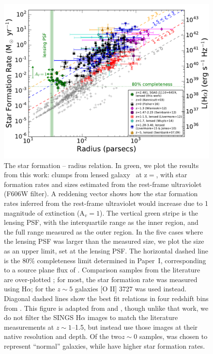 \begin{figure}
\includegraphics[width=\textwidth,angle=0]{Chap5/f2.pdf} %
\caption[The star formation -- radius relation for star forming clumps]{The star formation -- radius relation.  
In green, we plot the results from this work:
clumps from lensed galaxy  \giantarc\ at z$=$\zA,  
with star formation rates and sizes estimated 
from the rest-frame ultraviolet (F606W filter).  A reddening vector shows how the 
star formation rates inferred from the rest-frame ultraviolet would increase 
due to 1 magnitude of extinction (A$_v=1$).
The vertical green stripe is the lensing PSF, with the interquartile range 
as the inner region, and the full range measured as the outer region. 
In the five cases
where the lensing PSF was larger than the measured size,
we plot the size as an upper limit, set at the lensing PSF. 
The horizontal dashed line is the $80\%$ completeness limit determined
in Paper~I, corresponding to a source plane flux of \fluxcompleteness.
Comparison samples from the literature are over-plotted 
\citep{Swinbank:2007wj, Swinbank:2009lk, Jones:2010uq, Wisnioski:2012qf, 
Livermore:2012fk, Swinbank:2012jk, Wuyts:2014uq, Livermore:2015ve, Fisher:2017tk}; 
for most,   the star formation rate was measured using H$\alpha$; 
for the $z\sim5$ galaxies [O II] 3727 was used instead.  
Diagonal dashed lines show the best fit relations in four redshift bins
from \citet{Livermore:2015ve}.
This figure is adapted from \citet{Livermore:2012fk} and \citet{Livermore:2015ve}, 
though unlike that work, we do not filter the SINGS H$\alpha$ images 
\citep{Kennicutt:2003xq} to 
match the literature measurements at $z\sim1$--1.5, but instead
use those images at their native resolution and depth.
Of the two$z\sim0$ samples, \citet{Kennicutt:2003xq}  was chosen 
to represent ``normal'' galaxies, while \citet{Fisher:2017tk} have  
higher star formation rates.
}
\label{chap5:fig:surfacedensity}
\end{figure}


